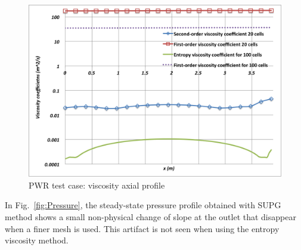 \documentclass[12pt]{article}
\newcommand{\fig}[1]{Fig.~\ref{#1}} %
\begin{document}
\begin{figure}[h]
\centering
\includegraphics[scale=0.4]{plots/Viscosity.png}
\caption{PWR test case: viscosity axial profile}
\label{fig:Viscosity}
\end{figure}
In \fig{fig:Pressure}, the steady-state pressure profile obtained with SUPG method shows a small non-physical change of slope at the outlet that disappear when a finer mesh is used. This artifact is not seen when using the entropy viscosity method. \\
\end{document}
